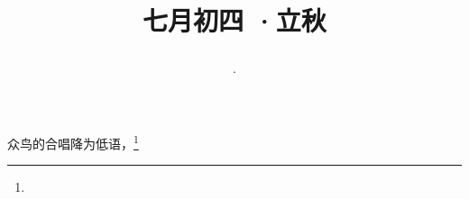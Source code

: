 \title{\date[d=7,m=8,y=2024][year:cn-y,年,month:cn,day:cn,日,·,weekday]·七月初四 ·立秋}
众鸟的合唱降为低语，\footnote{ }

